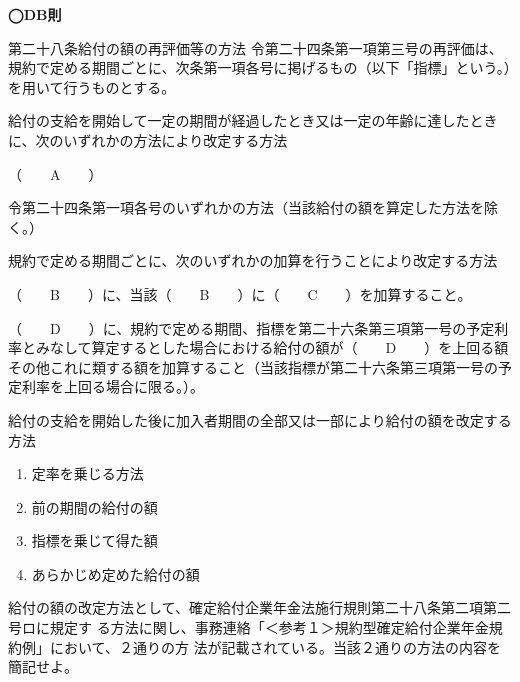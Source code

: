 \begin{fillblank}[数理人試験 H28 問題3 設問1]
  \noindent \textbf{◯DB則}
  \begin{lawstructure}
    \begin{lawarticle}{第二十八条}{給付の額の再評価等の方法}
      令第二十四条第一項第三号の再評価は、規約で定める期間ごとに、次条第一項各号に掲げるもの（以下「指標」という。）を用いて行うものとする。
      
      給付の支給を開始して一定の期間が経過したとき又は一定の年齢に達したときに、次のいずれかの方法により改定する方法

      （　　A　　）

      令第二十四条第一項各号のいずれかの方法（当該給付の額を算定した方法を除く。）

      規約で定める期間ごとに、次のいずれかの加算を行うことにより改定する方法

      （　　B　　）に、当該（　　B　　）に（　　C　　）を加算すること。

      （　　D　　）に、規約で定める期間、指標を第二十六条第三項第一号の予定利率とみなして算定するとした場合における給付の額が（　　D　　）を上回る額その他これに類する額を加算すること（当該指標が第二十六条第三項第一号の予定利率を上回る場合に限る。）。

      給付の支給を開始した後に加入者期間の全部又は一部により給付の額を改定する方法

    \end{lawarticle}
  \end{lawstructure}  
\end{fillblank}

\begin{answerbox}
  \begin{enumerate}[A:]
    \item 定率を乗じる方法
    \item 前の期間の給付の額
    \item 指標を乗じて得た額
    \item あらかじめ定めた給付の額
  \end{enumerate}
\end{answerbox}

\begin{shortanswer}[数理人試験 H28 問題3 設問2]
  給付の額の改定方法として、確定給付企業年金法施行規則第二十八条第二項第二号ロに規定す
る方法に関し、事務連絡「＜参考１＞規約型確定給付企業年金規約例」において、２通りの方
法が記載されている。当該２通りの方法の内容を簡記せよ。
\end{shortanswer}

